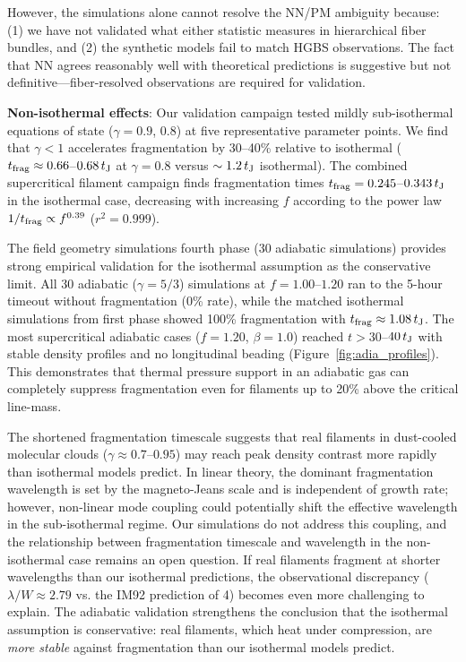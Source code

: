 \documentclass[twoside,twocolumn]{mnras}
\begin{document}
However, the simulations alone cannot resolve the NN/PM ambiguity because: (1) we have not validated what either statistic measures in hierarchical fiber bundles, and (2) the synthetic models fail to match HGBS observations. The fact that NN agrees reasonably well with theoretical predictions is suggestive but not definitive---fiber-resolved observations are required for validation.

\textbf{Non-isothermal effects}: Our validation campaign tested mildly sub-isothermal equations of state ($\gamma = 0.9$, $0.8$) at five representative parameter points. We find that $\gamma < 1$ accelerates fragmentation by 30--40\% relative to isothermal ($t_{\rm frag} \approx 0.66$--$0.68\,t_{\rm J}$ at $\gamma = 0.8$ versus $\sim 1.2\,t_{\rm J}$ isothermal). The combined supercritical filament campaign finds fragmentation times $t_{\rm frag} = 0.245$--$0.343\,t_{\rm J}$ in the isothermal case, decreasing with increasing $f$ according to the power law $1/t_{\rm frag} \propto f^{0.39}$ ($r^2 = 0.999$).

The field geometry simulations fourth phase (30 adiabatic simulations) provides strong empirical validation for the isothermal assumption as the conservative limit. All 30 adiabatic ($\gamma = 5/3$) simulations at $f = 1.00$--$1.20$ ran to the 5-hour timeout without fragmentation (0\% rate), while the matched isothermal simulations from first phase showed 100\% fragmentation with $t_{\rm frag} \approx 1.08\,t_{\rm J}$. The most supercritical adiabatic cases ($f = 1.20$, $\beta = 1.0$) reached $t > 30$--$40\,t_{\rm J}$ with stable density profiles and no longitudinal beading (Figure~\ref{fig:adia_profiles}). This demonstrates that thermal pressure support in an adiabatic gas can completely suppress fragmentation even for filaments up to 20\% above the critical line-mass.

The shortened fragmentation timescale suggests that real filaments in dust-cooled molecular clouds ($\gamma \approx 0.7$--$0.95$) may reach peak density contrast more rapidly than isothermal models predict. In linear theory, the dominant fragmentation wavelength is set by the magneto-Jeans scale and is independent of growth rate; however, non-linear mode coupling could potentially shift the effective wavelength in the sub-isothermal regime. Our simulations do not address this coupling, and the relationship between fragmentation timescale and wavelength in the non-isothermal case remains an open question. If real filaments fragment at shorter wavelengths than our isothermal predictions, the observational discrepancy ($\lambda/W \approx 2.79$ vs. the IM92 prediction of 4) becomes even more challenging to explain. The adiabatic validation strengthens the conclusion that the isothermal assumption is conservative: real filaments, which heat under compression, are {\it more stable} against fragmentation than our isothermal models predict.
\end{document}
